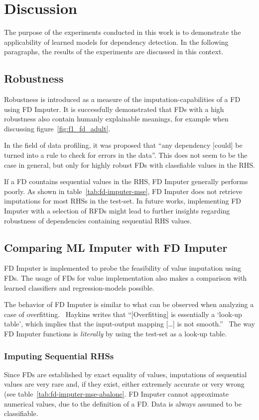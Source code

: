 \newpage
\section{Discussion}
The purpose of the experiments conducted in this work is to demonstrate the applicability of learned models for dependency detection.
In the following paragraphs, the results of the experiments are discussed in this context.

\subsection{Robustness}
Robustness is introduced as a measure of the imputation-capabilities of a FD using FD Imputer.
It is successfully demonstrated that FDs with a high robustness also contain humanly explainable meanings, for example when discussing figure~\ref{fig:f1_fd_adult}.

In the field of data profiling, it was proposed that ``any dependency [could] be turned into a rule to check for errors in the data''.\cite[p.~9]{ABE19}
This does not seem to be the case in general, but only for highly robust FDs with classfiable values in the RHS.

If a FD countains sequential values in the RHS, FD Imputer generally performs poorly.
As shown in table~\ref{tab:fd-imputer-mse}, FD Imputer does not retrieve imputations for most RHSs in the test-set.
In future works, implementing FD Imputer with a selection of RFDs might lead to further insights regarding robustness of dependencies containing sequential RHS values.

\subsection{Comparing ML Imputer with FD Imputer}
FD Imputer is implemented to probe the feasibility of value imputation using FDs.
The usage of FDs for value implementation also makes a comparison with learned classifiers and regression-models possible.

The behavior of FD Imputer is similar to what can be observed when analyzing a case of overfitting.~\cite[p.~56]{SMO08}
Haykins writes that ``[Overfitting] is essentially a `look-up table', which implies that the input-output mapping [\dots] is not smooth.''~\cite[p.~165]{HAY08}
The way FD Imputer functions is \emph{literally} by using the test-set as a look-up table.

\subsubsection{Imputing Sequential RHSs}
Since FDs are established by exact equality of values, imputations of sequential values are very rare and, if they exist, either extremely accurate or very wrong (see table~\ref{tab:fd-imputer-mse-abalone}.
FD Imputer cannot approximate numerical values, due to the definition of a FD.
Data is always assumed to be classifiable.

